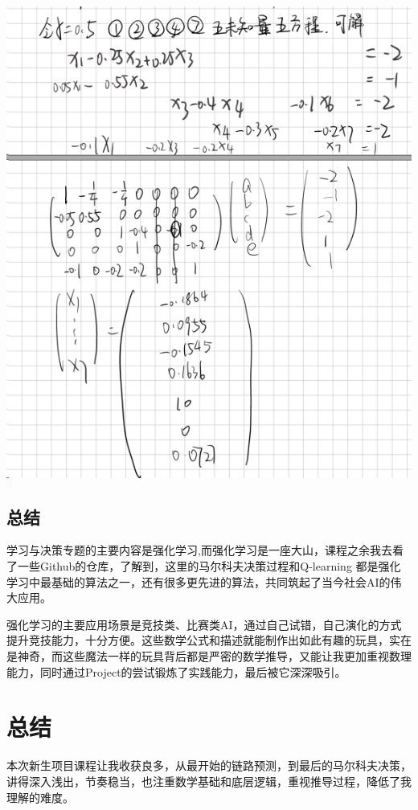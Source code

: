 \documentclass[letterpaper]{article} %
\begin{document}
\begin{center}
	\includegraphics[width=0.9\linewidth]{screenshot002}
\end{center}



\subsection{总结}
学习与决策专题的主要内容是强化学习,而强化学习是一座大山，课程之余我去看了一些Github的仓库，了解到，这里的马尔科夫决策过程和Q-learning 都是强化学习中最基础的算法之一，还有很多更先进的算法，共同筑起了当今社会AI的伟大应用。

强化学习的主要应用场景是竞技类、比赛类AI，通过自己试错，自己演化的方式提升竞技能力，十分方便。这些数学公式和描述就能制作出如此有趣的玩具，实在是神奇，而这些魔法一样的玩具背后都是严密的数学推导，又能让我更加重视数理能力，同时通过Project的尝试锻炼了实践能力，最后被它深深吸引。

\section{总结}

本次新生项目课程让我收获良多，从最开始的链路预测，到最后的马尔科夫决策，讲得深入浅出，节奏稳当，也注重数学基础和底层逻辑，重视推导过程，降低了我理解的难度。
\end{document}

